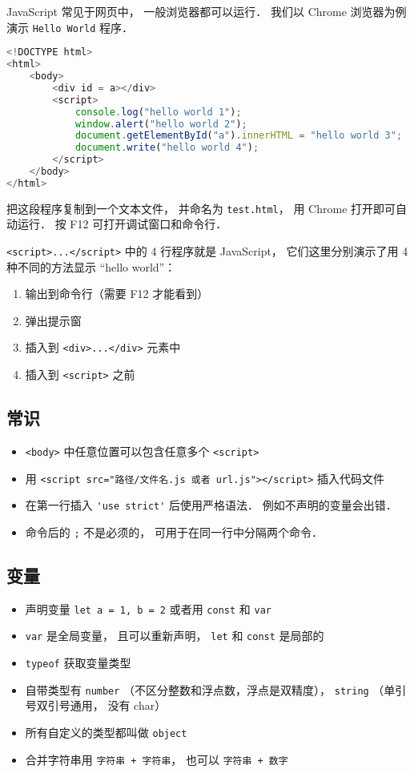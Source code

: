 
JavaScript 常见于网页中， 一般浏览器都可以运行． 我们以 Chrome 浏览器为例演示 \verb|Hello World| 程序．

\begin{lstlisting}[language=js]
<!DOCTYPE html>
<html>
	<body>
		<div id = a></div>
		<script>
            console.log("hello world 1");
            window.alert("hello world 2");
			document.getElementById("a").innerHTML = "hello world 3";
            document.write("hello world 4");
		</script>
	</body>
</html>
\end{lstlisting}
把这段程序复制到一个文本文件， 并命名为 \verb|test.html|， 用 Chrome 打开即可自动运行． 按 F12 可打开调试窗口和命令行．

\verb|<script>...</script>| 中的 4 行程序就是 JavaScript， 它们这里分别演示了用 4 种不同的方法显示 “hello world”：
\begin{enumerate}
\item 输出到命令行（需要 F12 才能看到）
\item 弹出提示窗
\item 插入到 \verb|<div>...</div>| 元素中
\item 插入到 \verb|<script>| 之前
\end{enumerate}

\subsection{常识}
\begin{itemize}
\item \verb|<body>| 中任意位置可以包含任意多个 \verb|<script>|
\item 用 \verb|<script src="路径/文件名.js 或者 url.js"></script>| 插入代码文件
\item 在第一行插入 \verb|'use strict'| 后使用严格语法． 例如不声明的变量会出错．
\item 命令后的 \verb|;| 不是必须的， 可用于在同一行中分隔两个命令．
\end{itemize}

\subsection{变量}
\begin{itemize}
\item 声明变量 \verb|let a = 1, b = 2| 或者用 \verb|const| 和 \verb|var|
\item \verb|var| 是全局变量， 且可以重新声明， \verb|let| 和 \verb|const| 是局部的
\item \verb|typeof| 获取变量类型
\item 自带类型有 \verb|number| （不区分整数和浮点数，浮点是双精度）， \verb|string| （单引号双引号通用， 没有 char）
\item 所有自定义的类型都叫做 \verb|object|
\item 合并字符串用 \verb|字符串 + 字符串|， 也可以 \verb|字符串 + 数字|
\end{itemize}

